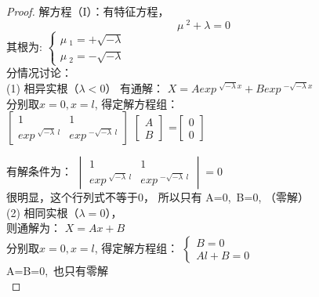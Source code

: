 \begin{example}
\begin{proof}
解方程（I）：有特征方程， 
\begin{equation*}
\mu~^2 +\lambda =0
\end{equation*}
其根为:
 $\displaystyle  \begin{cases}
	\mu~_1=+\sqrt{-\lambda}\\
	\mu~_2=-\sqrt{-\lambda}
\end{cases}$ \\	
分情况讨论：\\
(1) 相异实根（$\lambda < 0$）
有通解：	{ $\displaystyle 	X=Aexp~^{\sqrt{-\lambda}x} + Bexp~^{-\sqrt{-\lambda}x} $ } \\ \vspace{0.3cm}
分别取$x=0, x=l$, 得定解方程组：\\
$\left[
\begin{array}{lll}
	1&1\\
	exp~^{\sqrt{-\lambda}~l} &exp~^{-\sqrt{-\lambda}~l}
\end{array}
\right]$
$\left[
\begin{array}{ll}
	A\\
	B
\end{array}
\right]$
=$\left[
\begin{array}{ll}
	0\\
	0
\end{array}
\right]$

有解条件为：
$\begin{vmatrix}
	1&1\\
	exp~^{\sqrt{-\lambda}~l} &exp~^{-\sqrt{-\lambda}~l}
\end{vmatrix}
= 0$\\
很明显，这个行列式不等于0， 所以只有 A=0,~B=0, （零解）   \\

(2) 相同实根（$\lambda = 0$），\\
则通解为：	{ $\displaystyle 	X=Ax + B $ } \\ 
分别取$x=0, x=l$, 得定解方程组：
{$\displaystyle \left\{
	\begin{array}{lll}
		B=0\\
		Al+B=0
	\end{array} \right. $}\\
 A=B=0,~也只有零解 \\


\end{proof}
\end{example}
